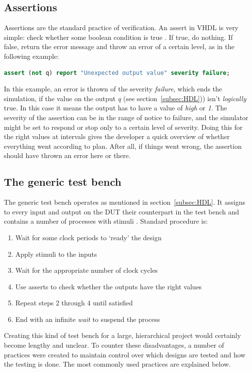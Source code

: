 \documentclass[11pt,british]{article}
\begin{document}
\subsection{Assertions}
\label{subsec:assertions}
Assertions are the standard practice of verification. An assert in VHDL is very simple: check whether some boolean condition is true \cite{assertformal}. If true, do nothing. If false, return the error message and throw an error of a certain level, as in the following example:
\begin{lstlisting}[language=VHDL, tabsize=4, frame=single, framesep=3mm, belowskip=8pt, aboveskip=8pt, showstringspaces=false, basicstyle=\small, linewidth=\textwidth]
assert (not q) report "Unexpected output value" severity failure;
\end{lstlisting}
In this example, an error is thrown of the severity \emph{failure}, which ends the simulation, if the value on the output \emph{q} (see section~\ref{subsec:HDL})) isn't \emph{logically} true. In this case it means the output has to have a value of \emph{high} or \emph{1}. The severity of the assertion can be in the range of notice to failure, and the simulator might be set to respond or stop only to a certain level of severity. Doing this for the right values at intervals gives the developer a quick overview of whether everything went according to plan. After all, if things went wrong, the assertion should have thrown an error here or there.

\subsection{The generic test bench}
The generic test bench operates as mentioned in section~\ref{subsec:HDL}. It assigns to every input and output on the \gls{DUT} their counterpart in the test bench and contains a number of processes with stimuli \cite{generictestbench}. Standard procedure is:
\begin{enumerate}%
\item Wait for some clock periods to `ready' the design
\item Apply stimuli to the inputs
\item Wait for the appropriate number of clock cycles
\item Use asserts to check whether the outputs have the right values
\item Repeat steps 2 through 4 until satisfied
\item End with an infinite \emph{wait} to suspend the process
\end{enumerate}
Creating this kind of test bench for a large, hierarchical project would certainly become lengthy and unclear. To counter these disadvantages, a number of practices were created to maintain control over which designs are tested and how the testing is done. The most commonly used practices are explained below.
\end{document}
